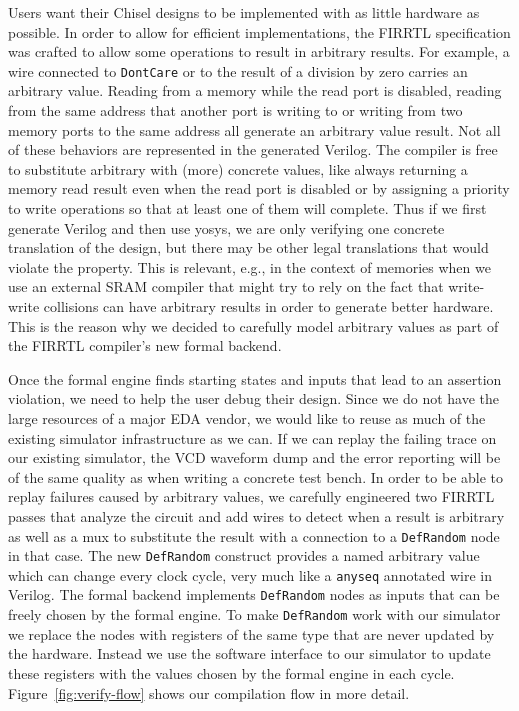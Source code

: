 \documentclass[conference]{IEEEtran}
\newcommand{\code}[1]{{\small{\texttt{#1}}}}
\begin{document}
Users want their Chisel designs to be implemented with as little hardware as possible.
In order to allow for efficient implementations, the FIRRTL specification was crafted to allow
some operations to result in arbitrary results.
For example, a wire connected to \code{DontCare} or to the result of a division by zero carries an arbitrary value.
Reading from a memory while the read port is disabled, reading from the same address that another port is writing to or
writing from two memory ports to the same address all generate an arbitrary value result.
Not all of these behaviors are represented in the generated Verilog.
The compiler is free to substitute arbitrary with (more) concrete values, like always returning a memory read result even
when the read port is disabled or by assigning a priority to write operations so that at least one of them will complete.
Thus if we first generate Verilog and then use yosys, we are only verifying one concrete translation of the design,
but there may be other legal translations that would violate the property.
This is relevant, e.g., in the context of memories when we use an external SRAM compiler that might try to
rely on the fact that write-write collisions can have arbitrary results in order to generate better hardware.
This is the reason why we decided to carefully model arbitrary values as part of the FIRRTL compiler's new formal backend.

Once the formal engine finds starting states and inputs that lead to an assertion violation, we need to help the user debug their design.
Since we do not have the large resources of a major EDA vendor, we would like to reuse as much of the existing simulator infrastructure as we can.
If we can replay the failing trace on our existing simulator, the VCD waveform dump and the error reporting will be of the same quality as
when writing a concrete test bench.
In order to be able to replay failures caused by arbitrary values, we carefully engineered two FIRRTL passes that analyze the circuit and
add wires to detect when a result is arbitrary as well as a mux to substitute the result with a connection to a \code{DefRandom} node in that case.
The new \code{DefRandom} construct provides a named arbitrary value which can change every clock cycle,
very much like a \code{anyseq} annotated wire in Verilog.
The formal backend implements \code{DefRandom} nodes as inputs that can be freely chosen by the formal engine.
To make \code{DefRandom} work with our simulator we  replace the nodes with registers of the same type that are never updated by the hardware.
Instead we use the software interface to our simulator to update these registers with the values chosen by the formal engine in each cycle.
Figure~\ref{fig:verify-flow} shows our compilation flow in more detail.
\end{document}
